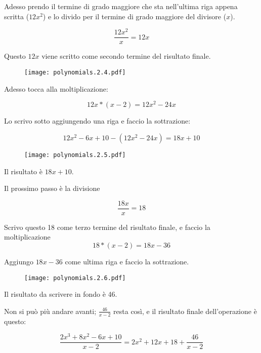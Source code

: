 Adesso prendo il termine di grado maggiore che sta nell'ultima riga appena scritta ($12x^2$) e lo divido per il termine di grado maggiore del divisore ($x$).

\begin{equation}
\frac{12x^2}
{x} = 12x
\end{equation}

Questo $12x$ viene scritto come secondo termine del risultato finale.


\begin{figure}[H]
\centering
\texttt{[image: polynomials.2.4.pdf]}
\end{figure}

Adesso tocca alla moltiplicazione:

\begin{equation}
12x * (x-2) = 12x^2-24x
\end{equation}

Lo scrivo sotto aggiungendo una riga e faccio la sottrazione:

\begin{equation}
12x^2-6x+10-( 12x^2-24x ) = 18x+10
\end{equation}

\begin{figure}[H]
\centering
\texttt{[image: polynomials.2.5.pdf]}
\end{figure}

Il risultato è $18x+10$.

Il prossimo passo è la divisione 

\begin{equation}
\frac{18x}{x}=18
\end{equation}

Scrivo questo 18 come terzo termine del risultato finale, e faccio la moltiplicazione
\begin{equation}
18*(x-2) = 18x-36
\end{equation}

Aggiungo $18x-36$ come ultima riga e faccio la sottrazione.

\begin{figure}[H]
\centering
\texttt{[image: polynomials.2.6.pdf]}
\end{figure}

Il risultato da scrivere in fondo è 46.

Non si può più andare avanti; $\frac{46}{x-2}$ resta così, e il risultato finale dell'operazione è questo:

\begin{equation}
\frac{2x^3+8x^2-6x+10}{x-2} = 2x^2+12x+18+\frac{46}{x-2}
\end{equation}

